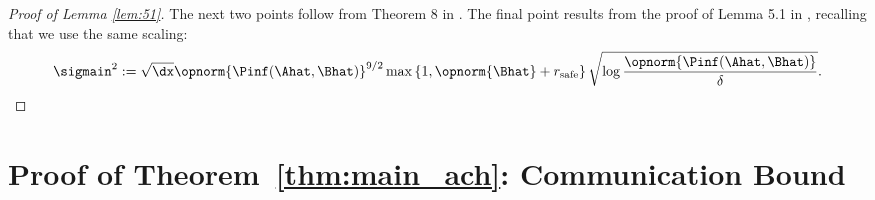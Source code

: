 \documentclass[11pt,journal,onecolumn]{IEEEtran}
\newcommand{\safe}{\mathrm{safe}}
\begin{document}
\begin{proof}[Proof of Lemma \ref{lem:51}]
    The next two points follow from Theorem 8 in \cite{simchowitz20a}. The final point results from the proof of Lemma 5.1 in \cite{simchowitz20a}, recalling that we use the same scaling:
    \begin{equation}\label{eq:sigmain-def}
        \sigmain^2 := \sqrt{\dx} \opnorm{\Pinf(\Ahat, \Bhat)}^{9/2} \max\left\{1, \opnorm{\Bhat} + r_\safe\right\} \sqrt{\log \frac{\opnorm{\Pinf(\Ahat, \Bhat)}}{\delta}}.
    \end{equation}

\end{proof}

\section{Proof of Theorem~\ref{thm:main_ach}: Communication Bound}
\label{app:comm-bound}
\end{document}
